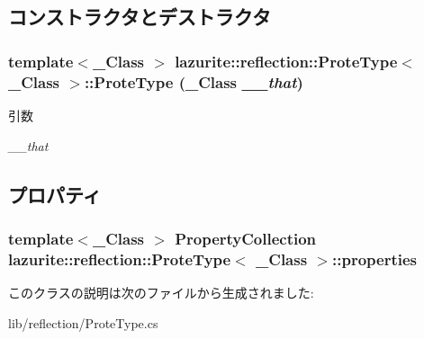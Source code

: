 \subsection{コンストラクタとデストラクタ}
\hypertarget{classlazurite_1_1reflection_1_1_prote_type_3_01___class_01_4_af3a433ed8e5433a6af4bd23719a823ad}{
\subsubsection[{ProteType}]{\setlength{\rightskip}{0pt plus 5cm}template$<$\_\-Class $>$ lazurite::reflection::ProteType$<$ \_\-Class $>$::ProteType (\_\-Class {\em \_\-\_\-that})}}
\label{classlazurite_1_1reflection_1_1_prote_type_3_01___class_01_4_af3a433ed8e5433a6af4bd23719a823ad}

\begin{DoxyParams}{引数}
\item[{\em \_\-\_\-that}]\end{DoxyParams}


\subsection{プロパティ}
\hypertarget{classlazurite_1_1reflection_1_1_prote_type_3_01___class_01_4_a0009b65ad9e76a865b8fef27a9b1578f}{
\subsubsection[{properties}]{\setlength{\rightskip}{0pt plus 5cm}template$<$\_\-Class $>$ {\bf PropertyCollection} lazurite::reflection::ProteType$<$ \_\-Class $>$::properties}}
\label{classlazurite_1_1reflection_1_1_prote_type_3_01___class_01_4_a0009b65ad9e76a865b8fef27a9b1578f}


このクラスの説明は次のファイルから生成されました:\begin{DoxyCompactItemize}
\item 
lib/reflection/ProteType.cs\end{DoxyCompactItemize}
